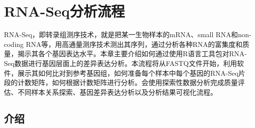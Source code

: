 \chapter{RNA-Seq分析流程}

RNA-Seq，即转录组测序技术，就是把某一生物样本的mRNA、small RNA和non-coding RNA等，用高通量测序技术测出其序列，通过分析各种RNA的富集度和质量，揭示其各个基因表达水平。本章主要介绍如何通过使用R语言\Bioconductor 工具包对RNA-Seq数据进行基因层面上的差异表达分析。本流程将从FASTQ文件开始，利用\Bioconductor 软件，展示其如何比对到参考基因组，如何准备每个样本中每个基因的RNA-Seq片段的计数矩阵，如何根据计数矩阵进行分析。会使用探索性数据分析完成质量评估、不同样本关系探索、基因差异表达分析以及分析结果可视化流程。

\section{\Bioconductor 介绍}